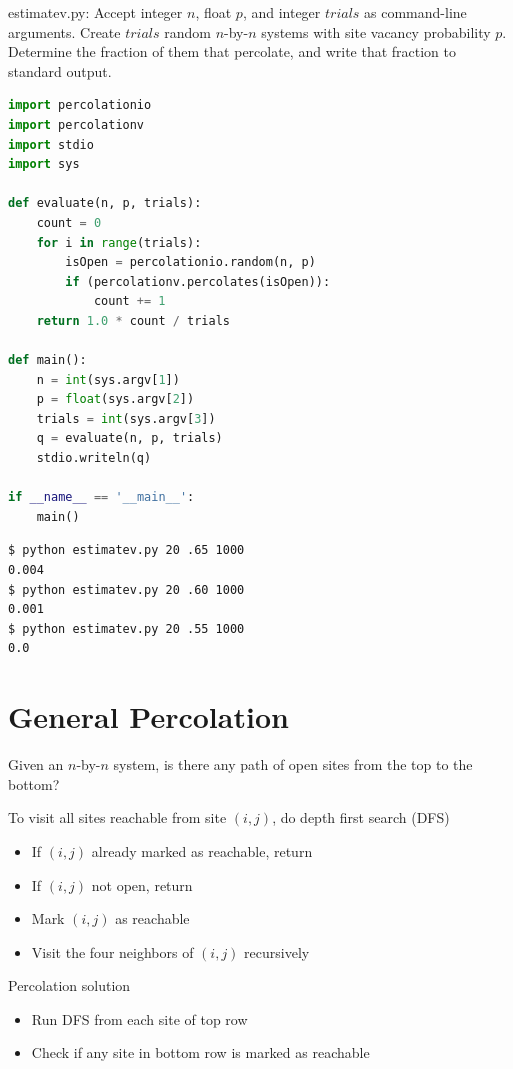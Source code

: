 \documentclass[8pt,a4paper,compress]{beamer}
\begin{document}
\begin{frame}[fragile]
\pause

\begin{framed}
\tiny estimatev.py: Accept integer $n$, float $p$, and integer $trials$ as command-line arguments. Create $trials$ random $n$-by-$n$ systems with site vacancy probability $p$. Determine the fraction of them that percolate, and
write that fraction to standard output.
\end{framed}

\begin{lstlisting}[language=Python]
import percolationio
import percolationv
import stdio
import sys

def evaluate(n, p, trials):
    count = 0
    for i in range(trials):
        isOpen = percolationio.random(n, p)
        if (percolationv.percolates(isOpen)):
            count += 1
    return 1.0 * count / trials

def main():
    n = int(sys.argv[1])
    p = float(sys.argv[2])
    trials = int(sys.argv[3])
    q = evaluate(n, p, trials)
    stdio.writeln(q)
    
if __name__ == '__main__': 
    main()
\end{lstlisting}

\pause

\begin{lstlisting}[language={}]
$ python estimatev.py 20 .65 1000
0.004
$ python estimatev.py 20 .60 1000
0.001
$ python estimatev.py 20 .55 1000
0.0
\end{lstlisting}
\end{frame}

\section{General Percolation}
\begin{frame}[fragile]
\pause

Given an $n$-by-$n$ system, is there any path of open sites from the top to the bottom?

\pause
\bigskip

To visit all sites reachable from site $(i, j)$, do depth first search (DFS)
\begin{itemize}
\item If $(i, j)$ already marked as reachable, return
\item If $(i, j)$ not open, return
\item Mark $(i, j)$ as reachable
\item Visit the four neighbors of $(i, j)$ recursively
\end{itemize}

\pause
\bigskip

Percolation solution
\begin{itemize}
\item Run DFS from each site of top row
\item Check if any site in bottom row is marked as reachable
\end{itemize}
\end{frame}
\end{document}
